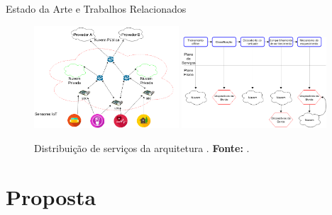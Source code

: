 \documentclass[aspectratio=1610,10pt]{beamer}
\begin{document}
\begin{frame}[fragile]{Estado da Arte e Trabalhos Relacionados}
\begin{figure}[ht]
  \centering
  \includegraphics[width=0.48\textwidth]{figuras/idsa-iot-quali-000.png}
  \hfill
  \includegraphics[width=0.48\textwidth]{figuras/idsa-iot-quali-004.png}
  \caption{Distribuição de serviços da arquitetura \arch. \textbf{Fonte:} .}
  \label{fig:ids-iot}
\end{figure}
\end{frame}

\newcommand{\mfog}{sistema M-FOG\xspace}

\section{Proposta}
\end{document}
